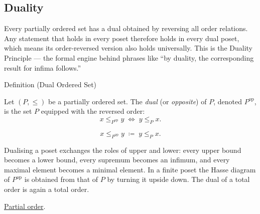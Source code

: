 
\subsection{Duality}
\label{sec:duality}

\begin{remark*}
Every partially ordered set has a dual obtained by reversing all order
relations.  Any statement that holds in every poset therefore holds in
every dual poset, which means its order-reversed version also holds
universally.  This is the Duality Principle --- the formal engine behind
phrases like ``by duality, the corresponding result for infima follows.''
\end{remark*}


\begin{definitionbox}{Definition (Dual Ordered Set)}
\begin{definition}
\label{def:dual-ordered-set}
Let $(P, \leq)$ be a partially ordered set.  The \emph{dual} (or
\emph{opposite}) of $P$, denoted $P^{\mathrm{op}}$, is the set $P$
equipped with the reversed order:
\[
x \leq_{P^{\mathrm{op}}} y \;\Longleftrightarrow\; y \leq_P x.
\]
\end{definition}
\end{definitionbox}

\begin{remark*}
\[
x \leq_{P^{\mathrm{op}}} y
\;\coloneqq\;
y \leq_P x.
\]
\end{remark*}

\begin{remark*}[Interpretation]
Dualising a poset exchanges the roles of upper and lower: every upper bound
becomes a lower bound, every supremum becomes an infimum, and every maximal
element becomes a minimal element.  In a finite poset the Hasse diagram of
$P^{\mathrm{op}}$ is obtained from that of $P$ by turning it upside down.
The dual of a total order is again a total order.
\end{remark*}

\begin{dependencies}
\hyperref[def:lattice-order-partial-order]{Partial order}.
\end{dependencies}

